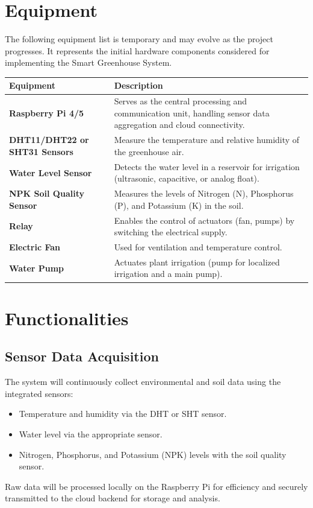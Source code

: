 \documentclass{report}
\begin{document}
\chapter{Equipment}
The following equipment list is temporary and may evolve as the project progresses. It represents the initial hardware components considered for implementing the Smart Greenhouse System.

\begin{tabularx}{\linewidth}{|l|X|}
    \hline
    \textbf{Equipment} & \textbf{Description} \\
    \hline
    \textbf{Raspberry Pi 4/5} & Serves as the central processing and communication unit, handling sensor data aggregation and cloud connectivity. \\
    \hline
    \textbf{DHT11/DHT22 or SHT31 Sensors} & Measure the temperature and relative humidity of the greenhouse air. \\
    \hline
    \textbf{Water Level Sensor} & Detects the water level in a reservoir for irrigation (ultrasonic, capacitive, or analog float). \\
    \hline
    \textbf{NPK Soil Quality Sensor} & Measures the levels of Nitrogen (N), Phosphorus (P), and Potassium (K) in the soil. \\
    \hline
    \textbf{Relay} & Enables the control of actuators (fan, pumps) by switching the electrical supply. \\
    \hline
    \textbf{Electric Fan} & Used for ventilation and temperature control. \\
    \hline
    \textbf{Water Pump} & Actuates plant irrigation (pump for localized irrigation and a main pump). \\
    \hline
\end{tabularx}

\chapter{Functionalities}
\section{Sensor Data Acquisition}
The system will continuously collect environmental and soil data using the integrated sensors:
\begin{itemize}
    \item Temperature and humidity via the DHT or SHT sensor.
    \item Water level via the appropriate sensor.
    \item Nitrogen, Phosphorus, and Potassium (NPK) levels with the soil quality sensor.
\end{itemize}
Raw data will be processed locally on the Raspberry Pi for efficiency and securely transmitted to the cloud backend for storage and analysis.
\end{document}
